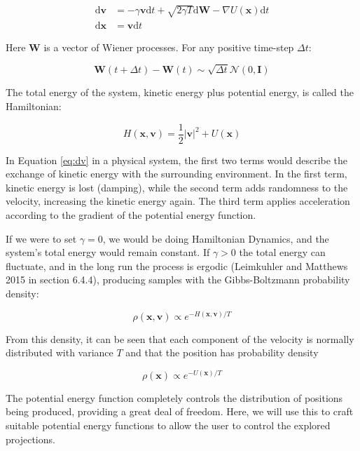 \begin{align}
\mathrm{d}\mathbf{v} &= 
    -\gamma \mathbf{v} \mathrm{d}t 
    + \sqrt{2\gamma T}\mathrm{d}\mathbf{W} 
    -\nabla U(\mathbf{x}) \mathrm{d}t
    \label{eq:dv}\\
\mathrm{d}\mathbf{x} &= \mathbf{v} \mathrm{d}t
    \label{eq:dx}
\end{align}

Here \(\mathbf W\) is a vector of Wiener processes. For any positive time-step \(\Delta t\):

\[
\mathbf W(t+\Delta t) - \mathbf W(t) \sim \sqrt{\Delta t} \mathcal N(0,\mathbf I)
\]

The total energy of the system, kinetic energy plus potential energy, is called the Hamiltonian:

\begin{equation*}
H(\mathbf{x},\mathbf{v}) = \frac{1}{2}|\mathbf{v}|^2 + U(\mathbf{x})
\end{equation*}

In Equation \eqref{eq:dv} in a physical system, the first two terms would describe the exchange of kinetic energy with the surrounding environment. In the first term, kinetic energy is lost (damping), while the second term adds randomness to the velocity, increasing the kinetic energy again. The third term applies acceleration according to the gradient of the potential energy function.

If we were to set \(\gamma=0\), we would be doing Hamiltonian Dynamics, and the system's total energy would remain constant. If \(\gamma>0\) the total energy can fluctuate, and in the long run the process is ergodic (Leimkuhler and Matthews 2015 in section 6.4.4), producing samples with the Gibbs-Boltzmann probability density:

\begin{equation*}
\rho(\mathbf{x},\mathbf{v}) \propto e^{ -H(\mathbf{x},\mathbf{v})/T }
\end{equation*}

From this density, it can be seen that each component of the velocity is normally distributed with variance \(T\) and that the position has probability density

\begin{equation*}
\rho(\mathbf{x}) \propto e^{ -U(\mathbf{x})/T }
\end{equation*}

The potential energy function completely controls the distribution of positions being produced, providing a great deal of freedom. Here, we will use this to craft suitable potential energy functions to allow the user to control the explored projections.

